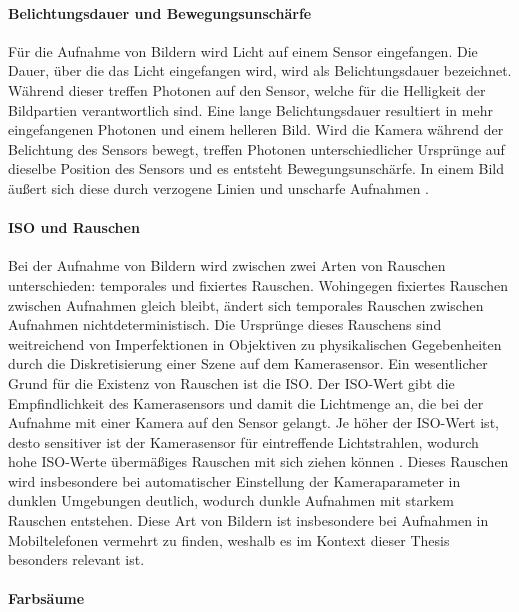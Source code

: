 \paragraph{Belichtungsdauer und Bewegungsunschärfe}

Für die Aufnahme von Bildern wird Licht auf einem Sensor eingefangen. Die Dauer, über die das Licht eingefangen wird, wird als Belichtungsdauer bezeichnet. Während dieser treffen Photonen auf den Sensor, welche für die Helligkeit der Bildpartien verantwortlich sind. Eine lange Belichtungsdauer resultiert in mehr eingefangenen Photonen und einem helleren Bild. Wird die Kamera während der Belichtung des Sensors bewegt, treffen Photonen unterschiedlicher Ursprünge auf dieselbe Position des Sensors und es entsteht Bewegungsunschärfe. In einem Bild äußert sich diese durch verzogene Linien und unscharfe Aufnahmen \cite{motion_blur}.

\paragraph{ISO und Rauschen}

Bei der Aufnahme von Bildern wird zwischen zwei Arten von Rauschen unterschieden: temporales und fixiertes Rauschen. Wohingegen fixiertes Rauschen zwischen Aufnahmen gleich bleibt, ändert sich temporales Rauschen zwischen Aufnahmen nichtdeterministisch. Die Ursprünge dieses Rauschens sind weitreichend von Imperfektionen in Objektiven zu physikalischen Gegebenheiten durch die Diskretisierung einer Szene auf dem Kamerasensor. Ein wesentlicher Grund für die Existenz von Rauschen ist die ISO. Der ISO-Wert gibt die Empfindlichkeit des Kamerasensors und damit die Lichtmenge an, die bei der Aufnahme mit einer Kamera auf den Sensor gelangt. Je höher der ISO-Wert ist, desto sensitiver ist der Kamerasensor für eintreffende Lichtstrahlen, wodurch hohe ISO-Werte übermäßiges Rauschen mit sich ziehen können \cite{camera_everything}. Dieses Rauschen wird insbesondere bei automatischer Einstellung der Kameraparameter in dunklen Umgebungen deutlich, wodurch dunkle Aufnahmen mit starkem Rauschen entstehen. Diese Art von Bildern ist insbesondere bei Aufnahmen in Mobiltelefonen vermehrt zu finden, weshalb es im Kontext dieser Thesis besonders relevant ist.

\paragraph{Farbsäume}

